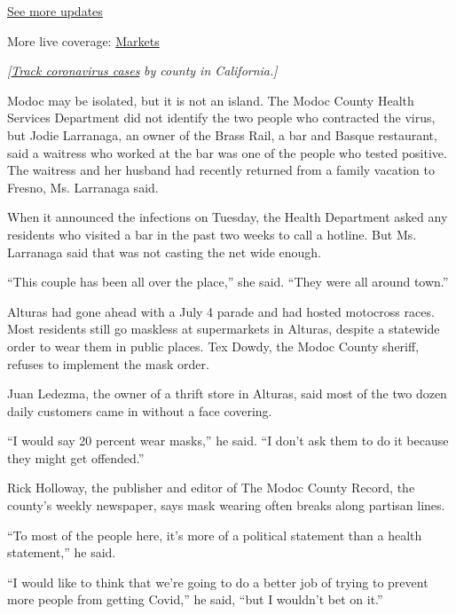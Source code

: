 \href{https://www.nytimes.com/2020/08/03/world/coronavirus-covid-19.html?action=click\&pgtype=Article\&state=default\&region=MAIN_CONTENT_1\&context=storylines_live_updates}{See
more updates}

More live coverage:
\href{https://www.nytimes.com/live/2020/08/03/business/stock-market-today-coronavirus?action=click\&pgtype=Article\&state=default\&region=MAIN_CONTENT_1\&context=storylines_live_updates}{Markets}

\emph{{[}}\href{https://www.nytimes.com/interactive/2020/us/california-coronavirus-cases.html}{\emph{Track
coronavirus cases}} \emph{by county in California.{]}}

Modoc may be isolated, but it is not an island. The Modoc County Health
Services Department did not identify the two people who contracted the
virus, but Jodie Larranaga, an owner of the Brass Rail, a bar and Basque
restaurant, said a waitress who worked at the bar was one of the people
who tested positive. The waitress and her husband had recently returned
from a family vacation to Fresno, Ms. Larranaga said.

When it announced the infections on Tuesday, the Health Department asked
any residents who visited a bar in the past two weeks to call a hotline.
But Ms. Larranaga said that was not casting the net wide enough.

``This couple has been all over the place,'' she said. ``They were all
around town.''

Alturas had gone ahead with a July 4 parade and had hosted motocross
races. Most residents still go maskless at supermarkets in Alturas,
despite a statewide order to wear them in public places. Tex Dowdy, the
Modoc County sheriff, refuses to implement the mask order.

Juan Ledezma, the owner of a thrift store in Alturas, said most of the
two dozen daily customers came in without a face covering.

``I would say 20 percent wear masks,'' he said. ``I don't ask them to do
it because they might get offended.''

Rick Holloway, the publisher and editor of The Modoc County Record, the
county's weekly newspaper, says mask wearing often breaks along partisan
lines.

``To most of the people here, it's more of a political statement than a
health statement,'' he said.

``I would like to think that we're going to do a better job of trying to
prevent more people from getting Covid,'' he said, ``but I wouldn't bet
on it.''

